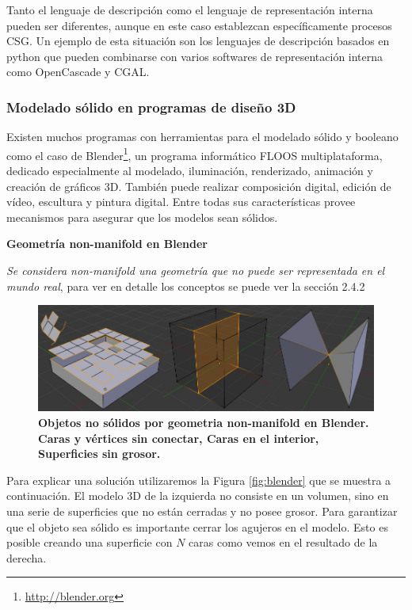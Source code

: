 Tanto el lenguaje de descripción como el lenguaje de representación interna pueden ser diferentes, aunque en este caso establezcan específicamente procesos CSG. Un ejemplo de esta situación son los lenguajes de descripción basados en python que pueden combinarse con varios softwares de representación interna como OpenCascade y CGAL.

\clearpage
\subsubsection{Modelado sólido en programas de diseño 3D}
Existen muchos programas con herramientas para el modelado sólido y booleano como el caso de Blender\footnote{\url{http://blender.org}}, un programa informático FLOOS multiplataforma, dedicado especialmente al modelado, iluminación, renderizado, animación y creación de gráficos 3D. También puede realizar composición digital, edición de vídeo, escultura y pintura digital. Entre todas sus características provee mecanismos para asegurar que los modelos sean sólidos.

\vspace{5mm}
\textbf{Geometría non-manifold en Blender}

\textit{Se considera non-manifold una geometría que no puede ser representada en el mundo real}, para ver en detalle los conceptos se puede ver la sección 2.4.2

\begin{figure}[h]
\includegraphics[width=12cm]{Img/Modelos/modelado20.jpg}
\centering
\caption{\textbf{ \footnotesize{Objetos no sólidos por geometria non-manifold en Blender. Caras y vértices sin conectar, Caras en el interior, Superficies sin grosor.}}}
\end{figure}


Para explicar una solución utilizaremos la Figura \ref{fig:blender} que se muestra a continuación. El modelo 3D de la izquierda no consiste en un volumen, sino en una serie de superficies que no están cerradas y no posee grosor. Para garantizar que el objeto sea sólido es importante cerrar los agujeros en el modelo. Esto es posible creando una superficie con $N$ caras como vemos en el resultado de la derecha.

